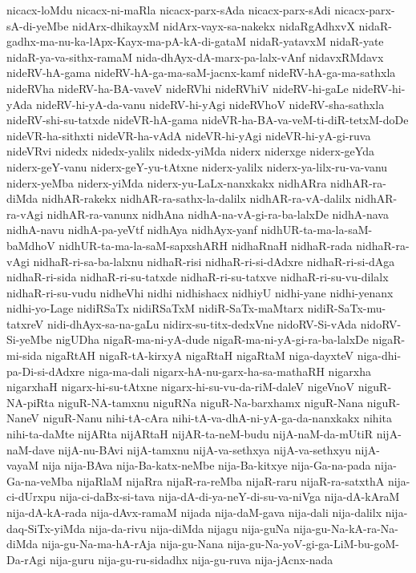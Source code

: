 {nicacx-loMdu
nicacx-ni-maRla
nicacx-parx-sAda
nicacx-parx-sAdi
nicacx-parx-sA-di-yeMbe
nidArx-dhikayxM
nidArx-vayx-sa-nakekx
nidaRgAdhxvX
nidaR-gadhx-ma-nu-ka-lApx-Kayx-ma-pA-kA-di-gataM
nidaR-yatavxM
nidaR-yate
nidaR-ya-va-sithx-ramaM
nida-dhAyx-dA-marx-pa-lalx-vAnf
nidavxRMdavx
nideRV-hA-gama
nideRV-hA-ga-ma-saM-jacnx-kamf
nideRV-hA-ga-ma-sathxla
nideRVha
nideRV-ha-BA-vaveV
nideRVhi
nideRVhiV
nideRV-hi-gaLe
nideRV-hi-yAda
nideRV-hi-yA-da-vanu
nideRV-hi-yAgi
nideRVhoV
nideRV-sha-sathxla
nideRV-shi-su-tatxde
nideVR-hA-gama
nideVR-ha-BA-va-veM-ti-diR-tetxM-doDe
nideVR-ha-sithxti
nideVR-ha-vAdA
nideVR-hi-yAgi
nideVR-hi-yA-gi-ruva
nideVRvi
nidedx
nidedx-yalilx
nidedx-yiMda
niderx
niderxge
niderx-geYda
niderx-geY-vanu
niderx-geY-yu-tAtxne
niderx-yalilx
niderx-ya-lilx-ru-va-vanu
niderx-yeMba
niderx-yiMda
niderx-yu-LaLx-nanxkakx
nidhARra
nidhAR-ra-diMda
nidhAR-rakekx
nidhAR-ra-sathx-la-dalilx
nidhAR-ra-vA-dalilx
nidhAR-ra-vAgi
nidhAR-ra-vanunx
nidhAna
nidhA-na-vA-gi-ra-ba-lalxDe
nidhA-nava
nidhA-navu
nidhA-pa-yeVtf
nidhAya
nidhAyx-yanf
nidhUR-ta-ma-la-saM-baMdhoV
nidhUR-ta-ma-la-saM-sapxshARH
nidhaRnaH
nidhaR-rada
nidhaR-ra-vAgi
nidhaR-ri-sa-ba-lalxnu
nidhaR-risi
nidhaR-ri-si-dAdxre
nidhaR-ri-si-dAga
nidhaR-ri-sida
nidhaR-ri-su-tatxde
nidhaR-ri-su-tatxve
nidhaR-ri-su-vu-dilalx
nidhaR-ri-su-vudu
nidheVhi
nidhi
nidhishacx
nidhiyU
nidhi-yane
nidhi-yenanx
nidhi-yo-Lage
nidiRSaTx
nidiRSaTxM
nidiR-SaTx-maMtarx
nidiR-SaTx-mu-tatxreV
nidi-dhAyx-sa-na-gaLu
nidirx-su-titx-dedxVne
nidoRV-Si-vAda
nidoRV-Si-yeMbe
nigUDha
nigaR-ma-ni-yA-dude
nigaR-ma-ni-yA-gi-ra-ba-lalxDe
nigaR-mi-sida
nigaRtAH
nigaR-tA-kirxyA
nigaRtaH
nigaRtaM
niga-dayxteV
niga-dhi-pa-Di-si-dAdxre
niga-ma-dali
nigarx-hA-nu-garx-ha-sa-mathaRH
nigarxha
nigarxhaH
nigarx-hi-su-tAtxne
nigarx-hi-su-vu-da-riM-daleV
nigeVnoV
niguR-NA-piRta
niguR-NA-tamxnu
niguRNa
niguR-Na-barxhamx
niguR-Nana
niguR-NaneV
niguR-Nanu
nihi-tA-cAra
nihi-tA-va-dhA-ni-yA-ga-da-nanxkakx
nihita
nihi-ta-daMte
nijARta
nijARtaH
nijAR-ta-neM-budu
nijA-naM-da-mUtiR
nijA-naM-dave
nijA-nu-BAvi
nijA-tamxnu
nijA-va-sethxya
nijA-va-sethxyu
nijA-vayaM
nija
nija-BAva
nija-Ba-katx-neMbe
nija-Ba-kitxye
nija-Ga-na-pada
nija-Ga-na-veMba
nijaRlaM
nijaRra
nijaR-ra-reMba
nijaR-raru
nijaR-ra-satxthA
nija-ci-dUrxpu
nija-ci-daBx-si-tava
nija-dA-di-ya-neY-di-su-va-niVga
nija-dA-kAraM
nija-dA-kA-rada
nija-dAvx-ramaM
nijada
nija-daM-gava
nija-dali
nija-dalilx
nija-daq-SiTx-yiMda
nija-da-rivu
nija-diMda
nijagu
nija-guNa
nija-gu-Na-kA-ra-Na-diMda
nija-gu-Na-ma-hA-rAja
nija-gu-Nana
nija-gu-Na-yoV-gi-ga-LiM-bu-goM-Da-rAgi
nija-guru
nija-gu-ru-sidadhx
nija-gu-ruva
nija-jAcnx-nada
}
